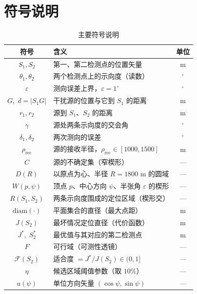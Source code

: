 \section{符号说明}

\begin{table}[H]
  \centering
  \caption{主要符号说明}
  \begin{tabular}{clc}
    \toprule
    \textbf{符号} & \textbf{含义} & \textbf{单位} \\
    \midrule
    $S_1,S_2$                 & 第一、第二检测点的位置矢量 & m \\
    $\theta_1,\theta_2$       & 两个检测点上的示向度（读数） & $^\circ$ \\
    $\varepsilon$             & 测向误差上界，$\varepsilon=1^\circ$ & $^\circ$ \\
    $G,\;d=|S_1G|$            & 干扰源的位置与它到 $S_1$ 的距离 & m \\
    $r_1,r_2$                 & 源到 $S_1$、$S_2$ 的距离 & m \\
    $\gamma$                  & 源处两条示向度的交会角 & $^\circ$ \\
    $\delta_1,\delta_2$       & 两次测向的误差 & $^\circ$ \\
    $\rho_{\mathrm{rec}}$     & 源的接收半径，$\rho_{\mathrm{rec}}\in[1000,1500]$ & m \\
    $C$                       & 源的不确定集（窄楔形） & --- \\
    $D(R)$                    & 以原点为心、半径 $R=1800$ m 的圆域 & --- \\
    $W(p,\psi)$               & 顶点 $p$、中心方向 $\psi$、半张角 $\varepsilon$ 的楔形 & --- \\
    $R(S_1,S_2)$              & 两条示向度围成的定位区域（楔形交） & --- \\
    $\mathrm{diam}(\cdot)$    & 平面集合的直径（最大点距） & m \\
    $J(S_2)$                  & 最坏情况定位直径（代价函数） & m \\
    $J^*,\;S_2^*$             & 最优值与其对应的第二检测点 & m \\
    $F$                       & 可行域（可测性透镜） & --- \\
    $\mathcal{F}(S_2)$        & 适合度 $=J^*/J(S_2)\in(0,1]$ & --- \\
    $\eta$                    & 候选区域阈值参数（取 $10\%$） & --- \\
    $u(\psi)$                 & 单位方向矢量 $(\cos\psi,\sin\psi)$ & --- \\

\end{tabular}
\end{table}
